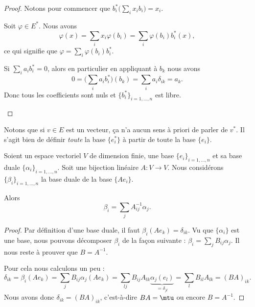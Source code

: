 \begin{proof}
	Notons pour commencer que \( b_i^*\big( \sum_ix_ib_i \big)=x_i\).
	\begin{subproof}
		\spitem[Générateur]
		Soit \( \varphi\in E^*\). Nous avons
		\begin{equation}
			\varphi(x)=\sum_ix_i\varphi(b_i)=\sum_i\varphi(b_i)b^*_i(x),
		\end{equation}
		ce qui signifie que \( \varphi=\sum_i\varphi(b_i)b^*_i\).

		\spitem[Libre]
		Si \( \sum_ia_ib^*_i=0\), alors en particulier en appliquant à \( b_k\) nous avons
		\begin{equation}
			0=\big( \sum_ia_ib^*_i \big)(b_k)=\sum_ia_i\delta_{ik}=a_k.
		\end{equation}
		Donc tous les coefficients sont nuls et \( \{ b_i^* \}_{i=1,\ldots,n}\) est libre.
	\end{subproof}
\end{proof}

Notons que si \( v\in E\) est un vecteur, ça n'a aucun sens à priori de parler de \( v^*\). Il s'agit bien de définir \emph{toute} la base \( \{ e_i^* \}\) à partir de toute la base \( \{ e_i \}\).

\begin{lemma}		\label{LEMooSVRIooFbxfue}
	Soient un espace vectoriel \( V\) de dimension finie, une base \( \{ e_i \}_{i=1,\ldots,n}\) et sa base duale \( \{ \alpha_i \}_{i=1,\ldots,n}\). Soit une bijection linéaire \(A \colon V\to V  \). Nous considérons \( \{ \beta_i \}_{i=1,\ldots,n}\) la base duale de la base \( \{ Ae_i \}\).

	Alors
	\begin{equation}
		\beta_i=\sum_jA^{-1}_{ij}\alpha_j.
	\end{equation}
\end{lemma}

\begin{proof}

	Par définition d'une base duale, il faut \( \beta_i(Ae_k)=\delta_{ik}\). Vu que \( \{ \alpha_i \}\) est une base, nous pouvons décomposer \( \beta_i\) de la façon suivante : \( \beta_i=\sum_jB_{ij}\alpha_j\). Il nous reste à prouver que \( B=A^{-1}\).

	Pour cela nous calculons un peu :
	\begin{equation}
		\delta_{ik}=\beta_i(Ae_k)=\sum_jB_{ij}\alpha_j(Ae_k)=\sum_{lj}B_{ij}A_{lk}\underbrace{\alpha_j(e_l)}_{=\delta_{jl}}=\sum_lB_{il}A_{lk}=(BA)_{ik}.
	\end{equation}
	Nous avons donc \( \delta_{ik}=(BA)_{ik}\), c'est-à-dire \( BA=\mtu\) ou encore \( B=A^{-1}\).
\end{proof}

